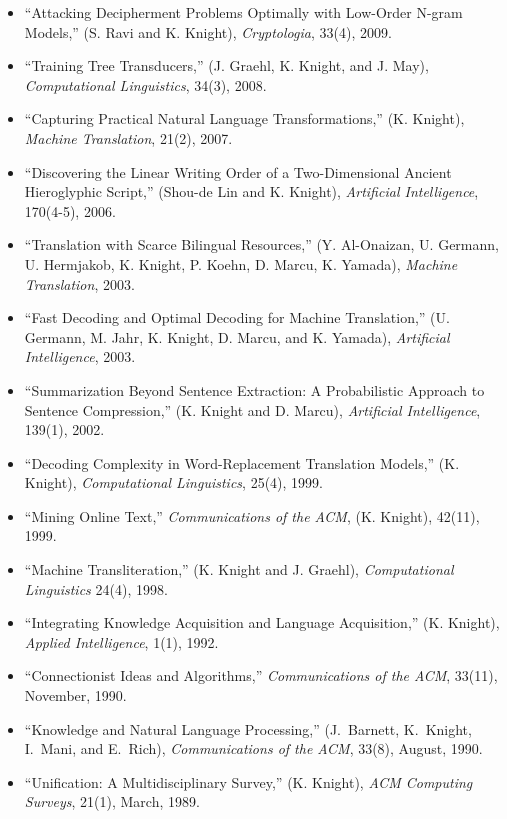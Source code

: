 \begin{itemize}
\item ``Attacking Decipherment Problems Optimally with Low-Order 
N-gram Models,''
(S. Ravi and K. Knight), {\em Cryptologia}, 33(4), 2009.

\item ``Training Tree Transducers,'' (J. Graehl, K. Knight, and J. May), 
{\em Computational Linguistics}, 34(3), 2008. 

\item ``Capturing Practical Natural Language Transformations,''  (K. Knight),
{\em Machine Translation}, 21(2), 2007. 

\item ``Discovering the Linear Writing Order of a Two-Dimensional
Ancient Hieroglyphic Script,'' (Shou-de Lin and K. Knight),
{\em Artificial Intelligence}, 170(4-5), 2006.

\item ``Translation with Scarce Bilingual Resources,'' (Y. Al-Onaizan, U. 
Germann, U. Hermjakob, K. Knight, P. Koehn, D. Marcu, K. Yamada), 
{\em Machine Translation}, 2003.

\item ``Fast Decoding and Optimal Decoding for Machine Translation,'' (U. 
Germann, M. Jahr, K. Knight, D. Marcu, and K. Yamada), {\em Artificial 
Intelligence}, 2003.

\item ``Summarization Beyond Sentence Extraction: A Probabilistic Approach 
to Sentence Compression,'' (K. Knight and D. Marcu), {\em Artificial 
Intelligence}, 139(1), 2002.

\item ``Decoding Complexity in Word-Replacement Translation Models,'' 
(K. Knight),
{\em Computational Linguistics}, 25(4), 1999. 

\item ``Mining Online Text,'' {\em Communications of the ACM}, 
(K. Knight), 42(11), 1999.

\item ``Machine Transliteration,'' 
(K. Knight and J. Graehl), {\em Computational Linguistics} 24(4), 1998.

\item ``Integrating Knowledge Acquisition and Language Acquisition,''
(K. Knight),
{\em Applied Intelligence}, 1(1), 1992.

\item ``Connectionist Ideas and Algorithms,'' {\em Communications of the ACM}, 
33(11), November, 1990.

\item ``Knowledge and Natural Language Processing,'' (J.~Barnett, K.~Knight,
I.~Mani, and E.~Rich), {\em Communications of the ACM}, 33(8), August, 1990.

\item ``Unification: A Multidisciplinary Survey,'' 
(K. Knight),
{\em ACM Computing
Surveys}, 21(1), March, 1989.
\end{itemize}


